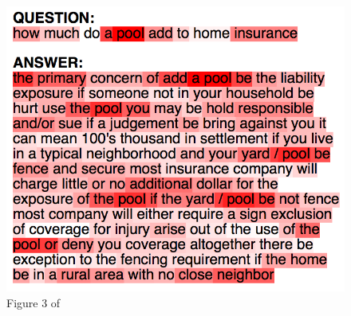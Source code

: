 \begin{figure}[h]
\centering
\includegraphics[width=0.7\columnwidth]{../img/attention_cnn}
\caption{Figure 3 of \citep{Santos2016}
}
\label{pic:att_cnn}
\end{figure}

